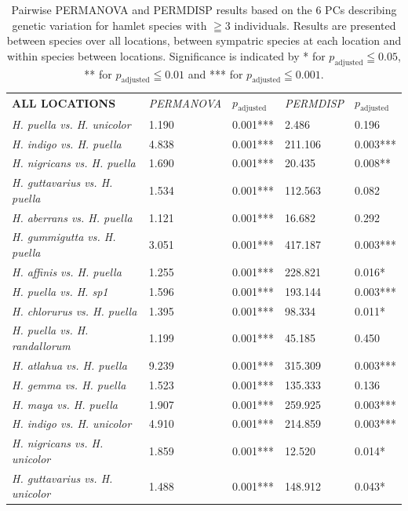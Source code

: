 \begin{xltabular}{\textwidth}{p{4.5cm}*{4}{X}}
\captionsetup{justification=justified}
\caption{Pairwise PERMANOVA and PERMDISP results based on the 6 PCs describing genetic variation for hamlet species with $\geqq 3$ individuals. Results are presented between species over all locations, between sympatric species at each location and within species between locations. Significance is indicated by * for $p_{\text{adjusted}} \leqq 0.05$, ** for $p_{\text{adjusted}} \leqq 0.01$ and *** for $p_{\text{adjusted}} \leqq 0.001$.}
\label{tab:s7}\\
\hline \hline
\addlinespace
\textbf{ALL LOCATIONS} & \emph{PERMANOVA} & $p_{\text{adjusted}}$ & \emph{PERMDISP} & $p_{\text{adjusted}}$ \\
\addlinespace
\hline \hline
\emph{H. puella vs. H. unicolor} & 1.190 & 0.001*** & 2.486 & 0.196 \\
\emph{H. indigo vs. H. puella} & 4.838 & 0.001*** & 211.106 & 0.003*** \\
\emph{H. nigricans vs. H. puella} & 1.690 & 0.001*** & 20.435 & 0.008** \\
\emph{H. guttavarius vs. H. puella} & 1.534 & 0.001*** & 112.563 & 0.082 \\
\emph{H. aberrans vs. H. puella} & 1.121 & 0.001*** & 16.682 & 0.292 \\
\emph{H. gummigutta vs. H. puella} & 3.051 & 0.001*** & 417.187 & 0.003*** \\
\emph{H. affinis vs. H. puella} & 1.255 & 0.001*** & 228.821 & 0.016* \\
\emph{H. puella vs. H. sp1} & 1.596 & 0.001*** & 193.144 & 0.003*** \\
\emph{H. chlorurus vs. H. puella} & 1.395 & 0.001*** & 98.334 & 0.011* \\
\emph{H. puella vs. H. randallorum} & 1.199 & 0.001*** & 45.185 & 0.450 \\
\emph{H. atlahua vs. H. puella} & 9.239 & 0.001*** & 315.309 & 0.003*** \\
\emph{H. gemma vs. H. puella} & 1.523 & 0.001*** & 135.333 & 0.136 \\
\emph{H. maya vs. H. puella} & 1.907 & 0.001*** & 259.925 & 0.003*** \\
\emph{H. indigo vs. H. unicolor} & 4.910 & 0.001*** & 214.859 & 0.003*** \\
\emph{H. nigricans vs. H. unicolor} & 1.859 & 0.001*** & 12.520 & 0.014* \\
\emph{H. guttavarius vs. H. unicolor} & 1.488 & 0.001*** & 148.912 & 0.043* \\

\end{xltabular}
